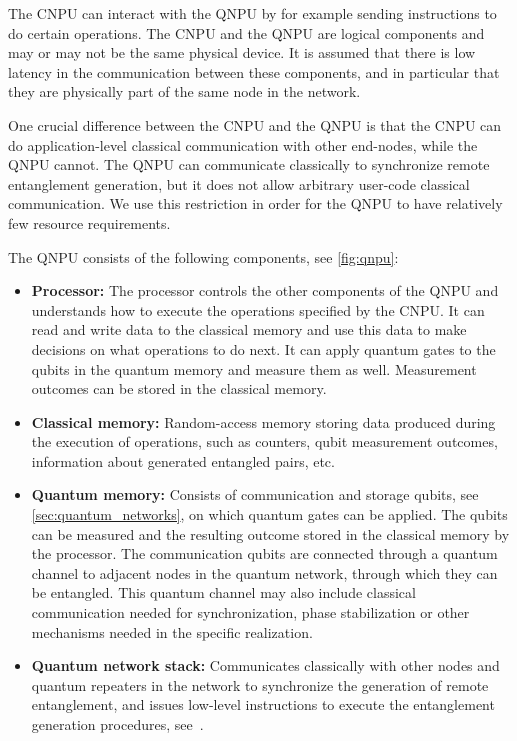 The \ac{CNPU} can interact with the \ac{QNPU} by for example sending instructions to do certain operations.
The \ac{CNPU} and the \ac{QNPU} are logical components and may or may not be the same physical device.
It is assumed that there is low latency in the communication between these components, and in particular that they are physically part of the same node in the network.

One crucial difference between the \ac{CNPU} and the \ac{QNPU} is that the \ac{CNPU} can do application-level classical communication with other end-nodes, while the \ac{QNPU} cannot.
The \ac{QNPU} can communicate classically to synchronize remote entanglement generation, but it does not allow arbitrary user-code classical communication.
We use this restriction in order for the \ac{QNPU} to have relatively few resource requirements.

The \ac{QNPU} consists of the following components, see \cref{fig:qnpu}:
\begin{itemize}
    \item \textbf{Processor:}
            The processor controls the other components of the \ac{QNPU} and understands how to execute the operations specified by the \ac{CNPU}.
            It can read and write data to the classical memory and use this data to make decisions on what operations to do next.
            It can apply quantum gates to the qubits in the quantum memory and measure them as well.
            Measurement outcomes can be stored in the classical memory.
    \item \textbf{Classical memory:}
            Random-access memory storing data produced during the execution of operations, such as counters, qubit measurement outcomes, information about generated entangled pairs, etc.
    \item \textbf{Quantum memory:}
            Consists of communication and storage qubits, see \cref{sec:quantum_networks}, on which quantum gates can be applied.
            The qubits can be measured and the resulting outcome stored in the classical memory by the processor.
            The communication qubits are connected through a quantum channel to adjacent nodes in the quantum network, through which they can be entangled.
            This quantum channel may also include classical communication needed for synchronization, phase stabilization or other mechanisms needed in the specific realization.
    \item \textbf{Quantum network stack:}
            Communicates classically with other nodes and quantum repeaters in the network to synchronize the generation of remote entanglement, and issues low-level instructions to execute the entanglement generation procedures, see~\cite{dahlberg2019linklayer,kozlowski2020networklayer}.
\end{itemize}

